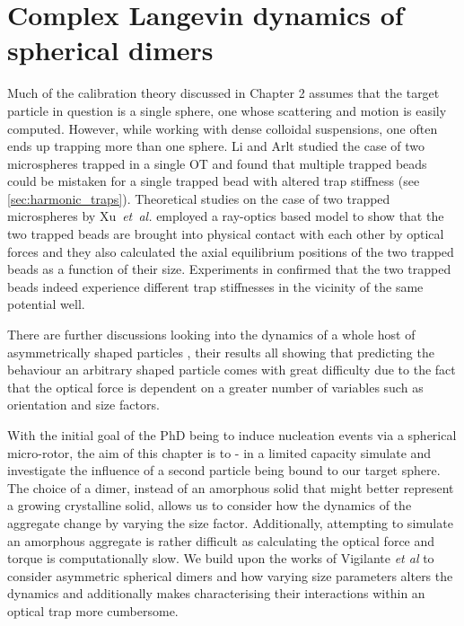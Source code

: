 \chapter{Complex Langevin dynamics of spherical dimers}
\label{chapter:langevin_dynamics}
Much of the calibration theory discussed in Chapter 2 assumes that 
the target particle in question is a single sphere, one whose 
scattering and motion is easily computed. However, while working 
with dense colloidal suspensions, one often ends up trapping more 
than one sphere. Li and Arlt \cite{Li2008} studied the case of two 
microspheres trapped in a single OT and found that multiple trapped 
beads could be mistaken for a single trapped bead with altered trap 
stiffness (see \ref{sec:harmonic_traps}). Theoretical studies on the 
case of two trapped microspheres by Xu~\textit{et~al.} \cite{Xu2005} 
employed a ray-optics based model to show that the two trapped beads 
are brought into physical contact with each other by optical forces 
and they also calculated the axial equilibrium positions of the two 
trapped beads as a function of their size. Experiments in 
\cite{Praveen2016} confirmed that the two trapped beads indeed 
experience different trap stiffnesses in the vicinity of the same 
potential well.
 
There are further discussions looking into the dynamics of a whole 
host of asymmetrically shaped particles \cite{Loudet2014, ShengHua2005, Chetana2022}, their results all showing that predicting the behaviour 
an arbitrary shaped particle comes with great difficulty due to the 
fact that the optical force is dependent on a greater number of 
variables such as orientation and size factors.

With the initial goal of the PhD being to induce nucleation events 
via a spherical micro-rotor, the aim of this chapter is to - in a 
limited capacity simulate and investigate the influence of a second 
particle being bound to our target sphere. The choice of a dimer, 
instead of an amorphous solid that might better represent a growing 
crystalline solid, allows us to consider how the dynamics of the 
aggregate change by varying the size factor. Additionally, attempting 
to simulate an amorphous aggregate is rather difficult as calculating 
the optical force and torque is computationally slow. We build upon 
the works of Vigilante \textit{et al} \cite{Vigilante2020} to consider 
asymmetric spherical dimers and how varying size parameters alters the 
dynamics and additionally makes characterising their interactions within 
an optical trap more cumbersome. 

